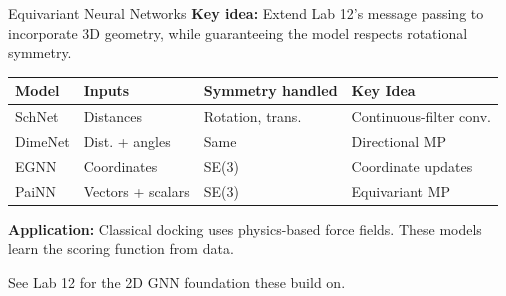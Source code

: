 \documentclass[aspectratio=169,10pt]{beamer}
\begin{document}




\begin{frame}{Equivariant Neural Networks}
\textbf{Key idea:} Extend Lab 12's message passing to incorporate 3D geometry, while guaranteeing the model respects rotational symmetry.

\vspace{0.2em}
\begin{center}
\renewcommand{\arraystretch}{1.15}
{\small
\begin{tabular}{p{2cm}p{2.5cm}p{2.5cm}p{3.5cm}}
\toprule
\textbf{Model} & \textbf{Inputs} & \textbf{Symmetry handled} & \textbf{Key Idea} \\
\midrule
SchNet & Distances & Rotation, trans. & Continuous-filter conv. \\
DimeNet & Dist. + angles & Same & Directional MP \\
EGNN & Coordinates & SE(3) & Coordinate updates \\
PaiNN & Vectors + scalars & SE(3) & Equivariant MP \\
\bottomrule
\end{tabular}}
\end{center}
\vspace{0.1em}
\textbf{Application:} Classical docking uses physics-based force fields. These models learn the scoring function from data.

\vspace{0.1em}
{\small See Lab 12 for the 2D GNN foundation these build on.}
\end{frame}
\end{document}
